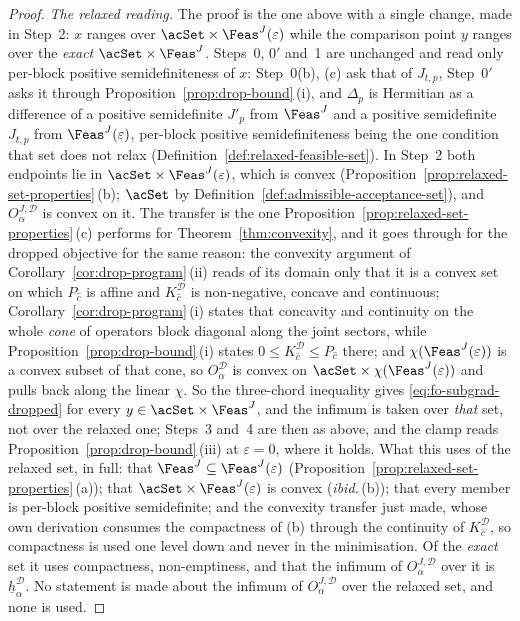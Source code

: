 \begin{proof}
\emph{The relaxed reading.} The proof is the one above with a single change,
made in Step~2: $x$ ranges over $\acSet\times\Feas^{J}(\varepsilon)$ while the
comparison point $y$ ranges over the \emph{exact} $\acSet\times\Feas^{J}$.
Steps~0, 0$'$ and~1 are unchanged and read only per-block positive
semidefiniteness of $x$: Step~0(b), (c) ask that of $J_{t,p}$, Step~0$'$
asks it through
Proposition~\ref{prop:drop-bound}\,(i), and $\Delta_p$ is
Hermitian as a difference of a positive semidefinite $J'_p$ from $\Feas^{J}$
and a positive semidefinite $J_{t,p}$ from $\Feas^{J}(\varepsilon)$, per-block
positive semidefiniteness being the one condition that set does not relax
(Definition~\ref{def:relaxed-feasible-set}). In Step~2 both endpoints lie in
$\acSet\times\Feas^{J}(\varepsilon)$, which is convex
(Proposition~\ref{prop:relaxed-set-properties}\,(b); $\acSet$ by
Definition~\ref{def:admissible-acceptance-set}), and
$O^{J,\mathcal{D}}_{\alpha}$ is convex on it. The transfer is the one
Proposition~\ref{prop:relaxed-set-properties}\,(c) performs for
Theorem~\ref{thm:convexity}, and it goes through for the dropped
objective for the same reason: the convexity argument of
Corollary~\ref{cor:drop-program}\,(ii) reads of its domain only
that it is a convex set on which $P_{\hat c}$ is affine and
$K^{\mathcal{D}}_{\hat c}$ is non-negative, concave and continuous;
Corollary~\ref{cor:drop-program}\,(i) states that concavity and
continuity on the whole \emph{cone} of operators block diagonal along the joint
sectors, while
Proposition~\ref{prop:drop-bound}\,(i) states
$0\le K^{\mathcal{D}}_{\hat c}\le P_{\hat c}$ there; and
$\chi(\Feas^{J}(\varepsilon))$ is a convex subset of that cone, so
$O^{\mathcal{D}}_{\alpha}$ is convex on
$\acSet\times\chi(\Feas^{J}(\varepsilon))$ and pulls back along the linear
$\chi$. So the three-chord inequality gives
\eqref{eq:fo-subgrad-dropped} for every $y\in\acSet\times\Feas^{J}$, and the
infimum is taken over \emph{that} set, not over the relaxed one; Steps~3
and~4 are then as above, and the clamp reads
Proposition~\ref{prop:drop-bound}\,(iii) at $\varepsilon=0$,
where it holds. What this uses of the relaxed set, in full: that
$\Feas^{J}\subseteq\Feas^{J}(\varepsilon)$
(Proposition~\ref{prop:relaxed-set-properties}\,(a)); that
$\acSet\times\Feas^{J}(\varepsilon)$ is convex (\emph{ibid.}\,(b)); that every
member is per-block positive semidefinite; and the convexity transfer just
made, whose own derivation consumes the compactness of (b) through the
continuity of $K^{\mathcal{D}}_{\hat c}$, so compactness is used one level down
and never in the minimisation. Of the \emph{exact} set it uses compactness,
non-emptiness, and that the infimum of $O^{J,\mathcal{D}}_{\alpha}$ over it is
$\underline{h}^{\mathcal{D}}_{\alpha}$. No statement is made about the
infimum of $O^{J,\mathcal{D}}_{\alpha}$ over the relaxed set, and none is
used.


\end{proof}
